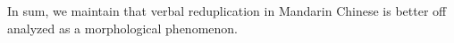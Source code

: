 In sum, we maintain that verbal reduplication in Mandarin Chinese is better off analyzed as a morphological phenomenon.







